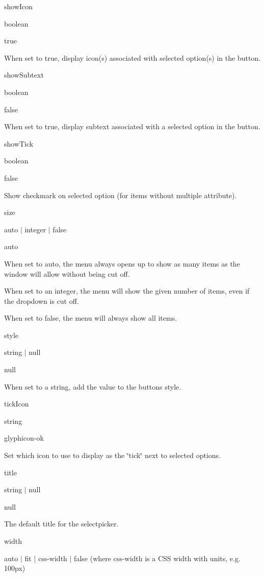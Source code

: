 show\+Icon 

boolean 

{\ttfamily true} 

When set to {\ttfamily true}, display icon(s) associated with selected option(s) in the button.

show\+Subtext 

boolean 

{\ttfamily false} 

When set to {\ttfamily true}, display subtext associated with a selected option in the button.

show\+Tick 

boolean 

{\ttfamily false} 

Show checkmark on selected option (for items without {\ttfamily multiple} attribute).

size 

{\ttfamily \textquotesingle{}auto\textquotesingle{}} $\vert$ integer $\vert$ false 

{\ttfamily \textquotesingle{}auto\textquotesingle{}} 

When set to {\ttfamily \textquotesingle{}auto\textquotesingle{}}, the menu always opens up to show as many items as the window will allow without being cut off.

When set to an integer, the menu will show the given number of items, even if the dropdown is cut off.

When set to {\ttfamily false}, the menu will always show all items.

style 

string $\vert$ null 

{\ttfamily null} 

When set to a string, add the value to the button\textquotesingle{}s style.

tick\+Icon 

string 

{\ttfamily \textquotesingle{}glyphicon-\/ok\textquotesingle{}} 

Set which icon to use to display as the \char`\"{}tick\char`\"{} next to selected options.

title 

string $\vert$ null 

{\ttfamily null} 

The default title for the selectpicker.

width 

{\ttfamily \textquotesingle{}auto\textquotesingle{}} $\vert$ {\ttfamily \textquotesingle{}fit\textquotesingle{}} $\vert$ css-\/width $\vert$ false (where {\ttfamily css-\/width} is a C\+SS width with units, e.\+g. {\ttfamily 100px}) 

